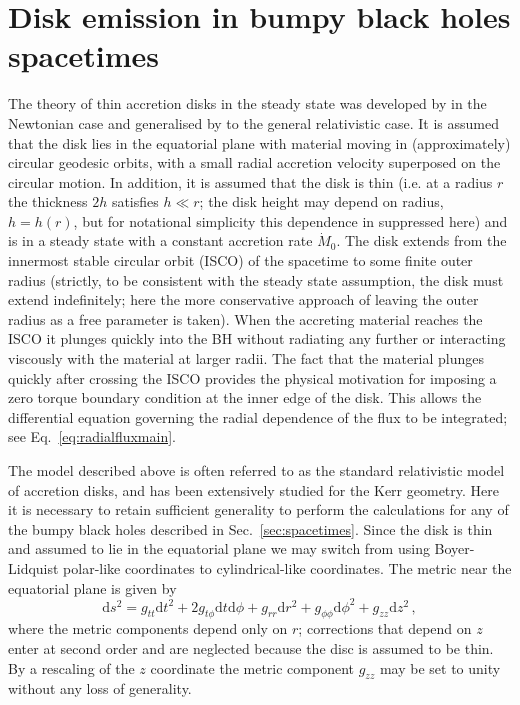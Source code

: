\section{Disk emission in bumpy black holes spacetimes}\label{sec:emission}
The theory of thin accretion disks in the steady state was developed by \cite{1973A&A....24..337S} in the Newtonian case and generalised by \cite{1974ApJ...191..499P} to the general relativistic case. It is assumed that the disk lies in the equatorial plane with material moving in (approximately) circular geodesic orbits, with a small radial accretion velocity superposed on the circular motion. In addition, it is assumed that the disk is thin (i.e. at a radius $r$ the thickness $2h$ satisfies $h\ll r$; the disk height may depend on radius, $h=h(r)$, but for notational simplicity this dependence in suppressed here) and is in a steady state with a constant accretion rate $\dot{M}_{0}$. The disk extends from the innermost stable circular orbit (ISCO) of the spacetime to some finite outer radius (strictly, to be consistent with the steady state assumption, the disk must extend indefinitely; here the more conservative approach of leaving the outer radius as a free parameter is taken). When the accreting material reaches the ISCO it plunges quickly into the BH without radiating any further or interacting viscously with the material at larger radii. The fact that the material plunges quickly after crossing the ISCO provides the physical motivation for imposing a zero torque boundary condition at the inner edge of the disk. This allows the differential equation governing the radial dependence of the flux to be integrated; see Eq.\ \ref{eq:radialfluxmain}. 

The model described above is often referred to as the standard relativistic model of accretion disks, and has been extensively studied for the Kerr geometry. Here it is necessary to retain sufficient generality to perform the calculations for any of the bumpy black holes described in Sec.\ \ref{sec:spacetimes}. Since the disk is thin and assumed to lie in the equatorial plane we may switch from using Boyer-Lidquist polar-like coordinates to cylindrical-like coordinates. The metric near the equatorial plane is given by
\begin{equation}\label{eq:metriccylindrical} \textrm{d}s^{2} = g_{tt}\textrm{d}t^{2}+2g_{t\phi}\textrm{d}t\textrm{d}\phi +g_{rr}\textrm{d}r^{2} + g_{\phi\phi}\textrm{d}\phi ^{2} + g_{zz} \textrm{d}z^{2}\, , \end{equation}
where the metric components depend only on $r$; corrections that depend on $z$ enter at second order and are neglected because the disc is assumed to be thin. By a rescaling of the $z$ coordinate the metric component $g_{zz}$ may be set to unity without any loss of generality.

